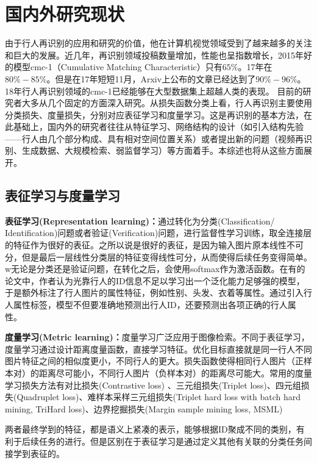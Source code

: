 \section{国内外研究现状}

由于行人再识别的应用和研究的价值，他在计算机视觉领域受到了越来越多的关注和巨大的发展。近几年，再识别领域投稿数量增加，性能也呈指数增长，2015年好的模型cmc-1（Cumulative Matching Characteristic）只有$65\%$。17年在$80\%-85\%$。但是在17年短短11月，Arxiv上公布的文章已经达到了$90\%-96\%$。18年行人再识别领域的cmc-1已经能够在大型数据集上超越人类的表现。
目前的研究者大多从几个固定的方面深入研究。从损失函数分类上看，行人再识别主要使用分类损失、度量损失，分别对应表征学习和度量学习。这是再识别的基本方法，在此基础上，国内外的研究者往往从特征学习、网络结构的设计（如引入结构先验——行人由几个部分构成、具有相对空间位置关系）或者提出新的问题（视频再识别、生成数据、大规模检索、弱监督学习）等方面着手。本综述也将从这些方面展开。

\subsection{表征学习与度量学习}

\textbf{表征学习(Representation learning)：}通过转化为分类(Classification/ Identification)问题或者验证(Verification)问题，进行监督性学习训练，取全连接层的特征作为很好的表征。之所以说是很好的表征，是因为输入图片原本线性不可分，但是最后一层线性分类层的特征变得线性可分，从而使得后续任务变得简单。w无论是分类还是验证问题，在转化之后，会使用softmax作为激活函数。在有的论文中，作者认为光靠行人的ID信息不足以学习出一个泛化能力足够强的模型，于是额外标注了行人图片的属性特征，例如性别、头发、衣着等属性。通过引入行人属性标签，模型不但要准确地预测出行人ID，还要预测出各项正确的行人属性。

\textbf{度量学习(Metric learning)：}度量学习广泛应用于图像检索。不同于表征学习，度量学习通过设计距离度量函数，直接学习特征。优化目标直接就是同一行人不同图片特征之间的相似度更小，不同行人的更大。损失函数使得相同行人图片（正样本对）的距离尽可能小，不同行人图片（负样本对）的距离尽可能大。常用的度量学习损失方法有对比损失(Contrastive loss) \cite{varior2016gated}、三元组损失(Triplet loss)、四元组损失(Quadruplet loss)、难样本采样三元组损失(Triplet hard loss with batch hard mining, TriHard loss)\cite{hermans2017defense}、边界挖掘损失(Margin sample mining loss, MSML)

两者最终学到的特征，都是语义上紧凑的表示，能够根据ID聚成不同的类别，有利于后续任务的进行。但是区别在于表征学习是通过定义其他有关联的分类任务间接学到表征的。

